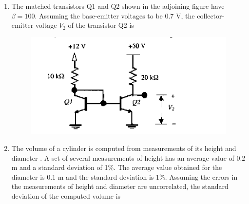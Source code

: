 \documentclass[journal,12pt,onecolumn]{IEEEtran}
\theoremstyle{remark}
\begin{document}
\begin{enumerate}
\item The matched transistors Q1 and Q2 shown in the adjoining figure have $\beta = 100$. Assuming the base-emitter voltages to be 0.7 V, the collector-emitter voltage $V_2$ of the transistor Q2 is
\begin{figure}[H]
    \centering
    \includegraphics[width = 0.7\columnwidth]{q33}
    \caption*{}
    \label{Q33}
\end{figure}
\hfill{}\begin{enumerate}  \end{enumerate}

\item The volume of a cylinder is computed from measurements of its height  and diameter . A set of several measurements of height has an average value of 0.2 m and a standard deviation of 1\%. The average value obtained for the diameter is 0.1 m and the standard deviation is 1\%. Assuming the errors in the measurements of height and diameter are uncorrelated, the standard deviation of the computed volume is
\hfill{}\begin{enumerate}  \end{enumerate}




\end{enumerate}
\end{document}
